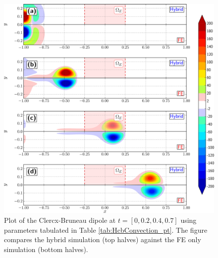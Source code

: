 	\begin{figure}[!t]
	\centering
	\includegraphics[width=\linewidth]{./figures/validation/cbConv/hybrid_doubleMonopoleConvection_contourfPlots-crop.png}
	\caption{Plot of the Clercx-Bruneau dipole at $t=[0,0.2,0.4,0.7]$ using parameters tabulated in Table \ref{tab:HcbConvection_pt}. The figure compares the hybrid simulation (top halves) against the FE only simulation (bottom halves).}
	\label{fig:hybrid_doubleMonopoleConvection_contourfPlots}
	\end{figure}

